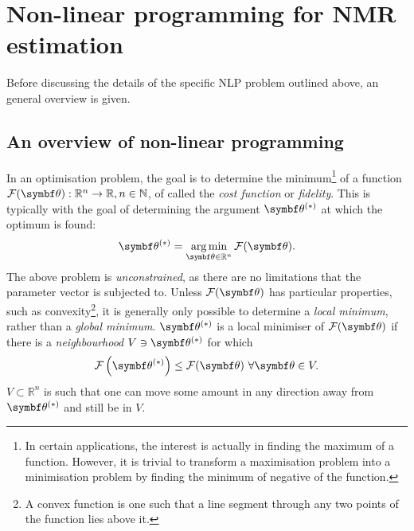 \section{Non-linear programming for NMR estimation}
\label{sec:nlp}
Before discussing the details of the specific \ac{NLP} problem outlined above,
an general overview is given.

\subsection{An overview of non-linear programming}
\label{subsec:nlp-overview}
In an optimisation problem, the goal is to determine the minimum\footnote{
    In certain applications, the interest is actually in finding the maximum of
    a function. However, it is trivial to transform a maximisation problem into
    a minimisation problem by finding the minimum of negative of the function.
}
of a function $\Fth: \mathbb{R}^n \rightarrow \mathbb{R}, n \in \mathbb{N}$, of
called the \emph{cost function} or \emph{fidelity}.
This is typically with the goal of determining the argument $\bthstar$ at
which the optimum is found:
\begin{equation}
    \bthstar = \argmin_{\bth \in \mathbb{R}^n} \Fth.
    \label{eq:minF}
\end{equation}
The above problem is \emph{unconstrained}, as there are no limitations that the
parameter vector is subjected to. Unless $\Fth$ has particular properties, such
as convexity\footnote{
    A convex function is one such that a line segment through any two points of
    the function lies above it.
}, it is generally only possible to determine a \emph{local minimum},
rather than a \emph{global minimum}. $\bthstar$ is a local
minimiser of $\Fth$ if there is a \emph{neighbourhood} $V \ni \bthstar$ for which
\begin{equation}
    \Fthstar \leq \Fth\ \forall \bth \in V.
  \label{def:local-minimiser}
\end{equation}
$V \subset \mathbb{R}^n$ is such that one can move some amount in any direction
away from $\bthstar$ and still be in $V$.

